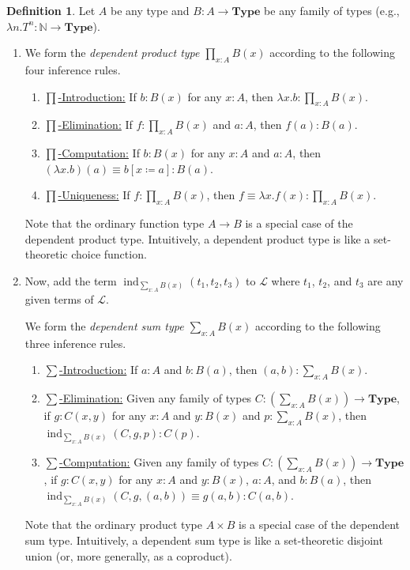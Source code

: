 \documentclass[10pt,letterpaper,cm]{nupset}
\theoremstyle{definition}
\newtheorem{definition}{Definition}[subsection]
\theoremstyle{theorem}
\theoremstyle{remark}
\newcommand{\N}{\mathbb N}
\newcommand{\1}{\mathbf{1}}
\newcommand{\0}{\vec 0}
\DeclareMathOperator{\ind}{ind}
\begin{document}
\begin{definition} Let $A$ be any type and $B : A \to \mathbf{Type}$ be any family of types (e.g., $\lambda n.T^n : \N \to \mathbf{Type}$).  
\begin{enumerate}
\item We form the \textit{dependent product type $\prod_{x:A} B(x)$} according to the following four inference rules.
\begin{enumerate}
\item \underline{${\prod}$-Introduction:} If $ b: B(x)$ for any $x: A$, then $\lambda x. b : \prod_{x : A} B(x)$.
\item \underline{${\prod}$-Elimination:} If $f:  \prod_{x : A} B(x)$ and $a: A$, then $f(a) : B(a)$.
\item \underline{${\prod}$-Computation:} If $ b: B(x)$ for any $x : A$ and $a: A$, then $\left(\lambda x.b\right)(a) \equiv b[x\coloneqq a]: B(a)$.
\item \underline{${\prod}$-Uniqueness:} If $f: \prod_{x:A} B(x)$, then $f \equiv \lambda x. f(x) : \prod_{x:A} B(x)$.
\end{enumerate}
Note that the ordinary function type $A \to B$ is a special case of the dependent product type. Intuitively, a dependent product type is like a set-theoretic choice function. 
\item Now, add the term $\ind_{\sum_{x:A}B(x)}(t_1, t_2, t_3)$ to $\mathcal{L}$ where $t_1$, $t_2$, and $t_3$ are any given terms of $\mathcal{L}$. 

We form the \textit{dependent sum type $\sum_{x:A} B(x)$} according to the following three inference rules.
\begin{enumerate}
\item \underline{${\sum}$-Introduction:} If $a: A$ and $b: B(a)$, then $\left(a, b\right) : \sum_{x: A} B(x)$.
\item \underline{${\sum}$-Elimination:} Given any family of types $C: \left(\sum_{x:A} B(x)\right) \to \mathbf{Type}$, if $g: C(x,y)$ for any $x: A$ and $y: B(x)$ and $p: \sum_{x:A}B(x)$, then $\ind_{\sum_{x:A}B(x)}(C, g, p) : C(p)$.
\item \underline{${\sum}$-Computation:}  Given any family of types $C: \left(\sum_{x:A} B(x)\right) \to \mathbf{Type}$, if $g: C(x,y)$ for any $x: A$ and $y: B(x)$, $a: A$, and $b: B(a)$, then $\ind_{\sum_{x:A}B(x)}(C, g, (a,b)) \equiv g(a,b) : C(a,b)$.
\end{enumerate}
Note that the ordinary product type $A  \times B$ is a special case of the dependent sum type. Intuitively, a dependent sum type is like a set-theoretic disjoint union (or, more generally, as a coproduct).
\end{enumerate}
\end{definition}
\end{document}
